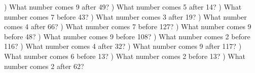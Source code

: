 \documentclass{article}%
\begin{document}
\newline%
\newline%
) What number comes 9 after 49?%
\newline%
\newline%
) What number comes 5 after 14?%
\newline%
\newline%
) What number comes 7 before 43?%
\newline%
\newline%
) What number comes 3 after 19?%
\newline%
\newline%
) What number comes 4 after 66?%
\newline%
\newline%
) What number comes 7 before 127?%
\newline%
\newline%
) What number comes 9 before 48?%
\newline%
\newline%
) What number comes 9 before 108?%
\newline%
\newline%
) What number comes 2 before 116?%
\newline%
\newline%
) What number comes 4 after 32?%
\newline%
\newline%
) What number comes 9 after 117?%
\newline%
\newline%
) What number comes 6 before 13?%
\newline%
\newline%
) What number comes 2 before 13?%
\newline%
\newline%
) What number comes 2 after 62?%
\end{document}
